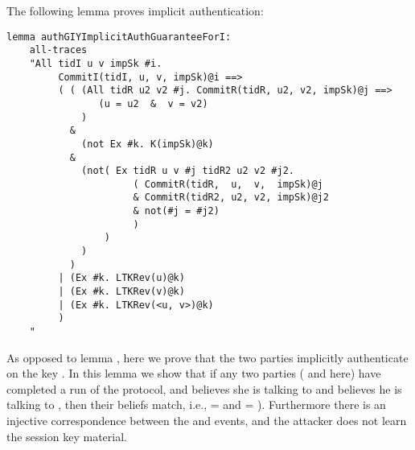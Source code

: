 {%
The following lemma proves implicit authentication:

\begin{lstlisting}
lemma authGIYImplicitAuthGuaranteeForI:
    all-traces
    "All tidI u v impSk #i.
         CommitI(tidI, u, v, impSk)@i ==>
         ( ( (All tidR u2 v2 #j. CommitR(tidR, u2, v2, impSk)@j ==>
                (u = u2  &  v = v2)
             )
           &
             (not Ex #k. K(impSk)@k)
           &
             (not( Ex tidR u v #j tidR2 u2 v2 #j2.
                      ( CommitR(tidR,  u,  v,  impSk)@j
                      & CommitR(tidR2, u2, v2, impSk)@j2
                      & not(#j = #j2)
                      )
                 )
             )
           )
         | (Ex #k. LTKRev(u)@k)
         | (Ex #k. LTKRev(v)@k)
         | (Ex #k. LTKRev(<u, v>)@k)
         )
    "
\end{lstlisting}
As opposed to lemma , here we prove that the two
parties implicitly authenticate on the key .
%
In this lemma we show that if any two parties ( and  here) 
have completed a run of the protocol, and  believes she is talking to
  and  believes he is talking to , then their beliefs
match, i.e.,  =  and  = ).
%
Furthermore there is an injective correspondence
between the  and  events, and the attacker does not
learn the session key material.
%
\\

}
